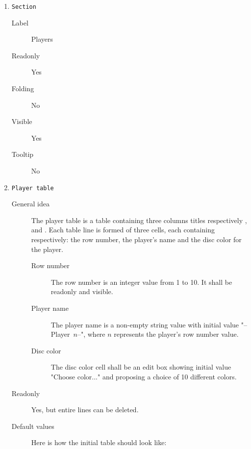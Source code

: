 \begin{enumerate}
    \item \texttt{Section}
              \begin{description}
                  \item[Label] Players
                  \item[Readonly] Yes
                  \item[Folding] No
                  \item[Visible] Yes
                  \item[Tooltip] No
              \end{description}

    \item \texttt{Player table} \label{enum:PlayerTable}
              \begin{description}
                  \item[General idea] The player table is a table containing three
                                      columns titles respectively ,
                                       and . Each table line
                                      is formed of three cells, each containing
                                      respectively: the row number, the player's
                                      name and the disc color for the player.
                  \begin{description}
                      \item[Row number]  The row number is an integer value from
                                         1 to 10. It shall be readonly and visible.
                      \item[Player name] The player name is a non-empty string value
                                         with initial value "--Player~$n$--", where
                                         $n$ represents the player's row number
                                         value.
                      \item[Disc color] The disc color cell shall be an edit box
                                        showing initial value "Choose color..." and
                                        proposing a choice of 10 different colors.
                  \end{description}
                  \item[Readonly] Yes, but entire lines can be deleted.
                  \item[Default values] Here is how the initial table should look
                                        like:


\end{description}
\end{enumerate}
